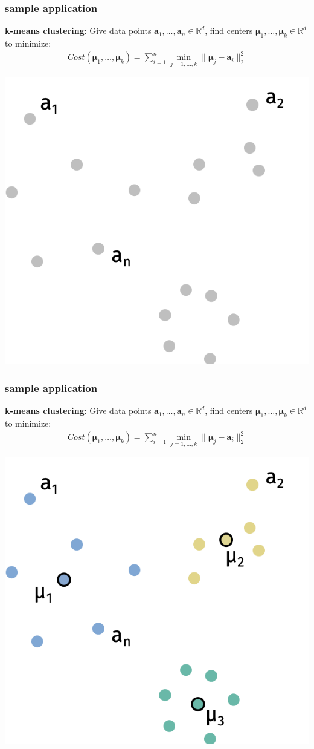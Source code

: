 \documentclass[compress]{beamer}
\newcommand{\bs}[1]{\boldsymbol{#1}}
\newcommand{\bv}[1]{\mathbf{#1}}
\newcommand{\R}{\mathbb{R}}
\begin{document}
\begin{frame}[t]
	\frametitle{sample application}
	\textbf{k-means clustering}: Give data points $\bv{a}_1,\ldots, \bv{a}_n \in \R^d$, find centers $\bs{\mu}_1, \ldots, \bs{\mu}_k\in \R^d$ to minimize:
	\begin{align*}
		Cost(\bs{\mu}_1,\ldots, \bs{\mu}_k) = \sum_{i=1}^n \min_{j = 1,\ldots,k} \|\bs{\mu}_j - \bv{a}_i\|_2^2
	\end{align*}
	\begin{center}
		\includegraphics[width=.5\textwidth]{kmeans1.png}
	\end{center}
\end{frame}
\begin{frame}[t]
	\frametitle{sample application}
	\textbf{k-means clustering}: Give data points $\bv{a}_1,\ldots, \bv{a}_n \in \R^d$, find centers $\bs{\mu}_1, \ldots, \bs{\mu}_k\in \R^d$ to minimize:
	\begin{align*}
		Cost(\bs{\mu}_1,\ldots, \bs{\mu}_k) = \sum_{i=1}^n \min_{j = 1,\ldots,k} \|\bs{\mu}_j - \bv{a}_i\|_2^2
	\end{align*}
	\begin{center}
		\includegraphics[width=.5\textwidth]{kmeans2.png}
	\end{center}
\end{frame}
\end{document}
